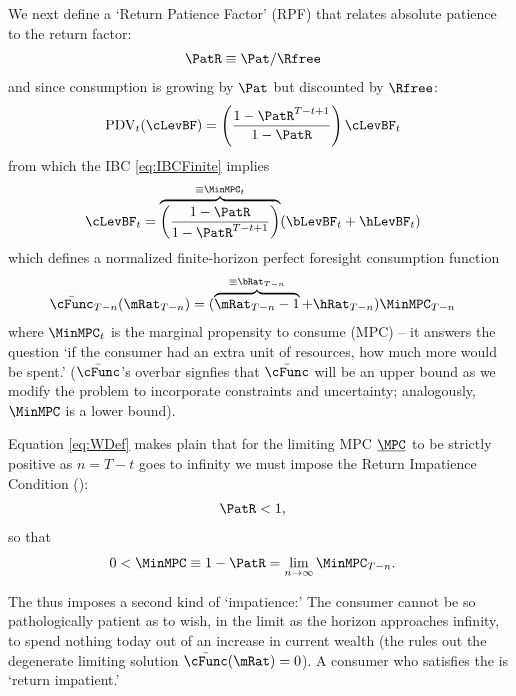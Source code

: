 \documentclass[BufferStockTheory]{subfiles}
\begin{document}
We next define a `Return Patience Factor' (RPF) that relates absolute patience to the return factor:
\begin{align}
  \PatR  & \equiv  {\Pat}/\Rfree \label{eq:PatR}
\end{align}
and since consumption is growing by $\Pat$ but discounted by $\Rfree$:
\begin{align}
  \mathrm{PDV}_{t}(\cLevBF)  & = \left(\frac{1-\PatR^{T-t+1}}{1-\PatR}\right)\cLevBF_{t}
\end{align}
from which the IBC \eqref{eq:IBCFinite} implies
\begin{align}
  \cLevBF_{t}  & = \overbrace{\left(\frac{1-\PatR}{1-\PatR^{T-t+1}}\right)}^{\equiv \MinMPC_{t}}
                 (\bLevBF_{t}+\hLevBF_{t})   \label{eq:WDef}
\end{align}
which defines a normalized finite-horizon perfect foresight consumption function
\begin{align}
  \bar{\cFunc}_{T-n}(\mRat_{T-n})  & = (\overbrace{\mRat_{T-n}-1}^{
                                     \equiv\bRat_{T-n}}+\hRat_{T-n})\MinMPC_{T-n}
\end{align}
where $\MinMPC_{t}$ is the marginal propensity to consume (MPC) -- it answers the
question `if the consumer had an extra unit of resources, how much more would be spent.' \hypertarget{RIC}{}
($\bar{\cFunc}$'s overbar signfies that $\bar{\cFunc}$ will be an upper bound as we modify the problem to incorporate constraints and uncertainty; analogously, $\MinMPC$ is a lower bound).

Equation \eqref{eq:WDef} makes plain that for the limiting MPC $\underbar{\MPC}$ to be strictly positive as $n=T-t$ goes to infinity we must impose the Return Impatience Condition (\RIC):
\begin{align}
  \PatR  & < 1   \label{eq:RIC},
\end{align}
so that
\begin{align}
  0 <  \MinMPC  & \equiv   1-\PatR = \lim_{n \rightarrow \infty} \MinMPC_{T-n} \label{eq:MinMPCDef}
                  .
\end{align}

The {\RIC} thus imposes a second kind of `impatience:' The consumer cannot be so pathologically patient as to wish, in the limit as the horizon approaches infinity, to spend nothing today out of an increase in current wealth (the {\RIC} rules out the degenerate limiting solution $\bar{\cFunc}(\mRat)=0$).  A consumer who satisfies the {\RIC} is `return impatient.'
\end{document}
